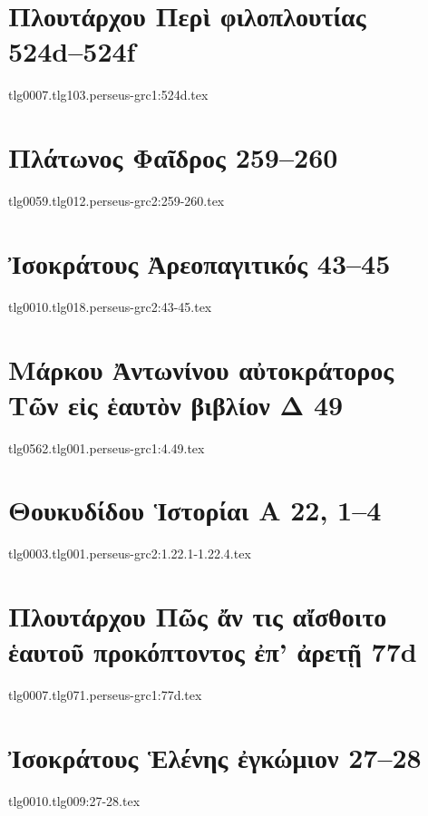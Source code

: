 \documentclass[a4paper,12pt,twoside]{report}
\begin{document}
\chapter[Πλουτάρχου Περὶ φιλοπλουτίας]{\textgreek[variant=ancient]{Πλουτάρχου Περὶ φιλοπλουτίας} \\524d–524f}
{tlg0007.tlg103.perseus-grc1:524d.tex}
\chapter[Πλάτωνος Φαῖδρος]{\textgreek[variant=ancient]{Πλάτωνος Φαῖδρος} 259–260}
{tlg0059.tlg012.perseus-grc2:259-260.tex}
\chapter[Ἰσοκράτους Ἀρεοπαγιτικός]{\textgreek[variant=ancient]{Ἰσοκράτους Ἀρεοπαγιτικός} 43–45}
{tlg0010.tlg018.perseus-grc2:43-45.tex}

\chapter[Μάρκου Ἀντωνίνου Τῶν εἰς ἑαυτὸν Δ 49]{\textgreek[variant=ancient]{Μάρκου Ἀντωνίνου αὐτοκράτορος \\Τῶν εἰς ἑαυτὸν βιβλίον Δ} 49}
{tlg0562.tlg001.perseus-grc1:4.49.tex}
\chapter[Θουκυδίδου Ἱστορίαι Α]{\textgreek[variant=ancient]{Θουκυδίδου Ἱστορίαι Α} 22, 1–4}

{tlg0003.tlg001.perseus-grc2:1.22.1-1.22.4.tex}
\chapter[Πλουτάρχου Πῶς ἄν τις αἴσθοιτο ἑαυτοῦ\dots]{\textgreek[variant=ancient]{Πλουτάρχου Πῶς ἄν τις αἴσθοιτο ἑαυτοῦ προκόπτοντος ἐπ' ἀρετῇ} 77d}
{tlg0007.tlg071.perseus-grc1:77d.tex}
\chapter[Ἰσοκράτους Ἑλένης ἐγκώμιον 27]{\textgreek[variant=ancient]{Ἰσοκράτους Ἑλένης ἐγκώμιον} 27–28}
{tlg0010.tlg009:27-28.tex}
\end{document}
